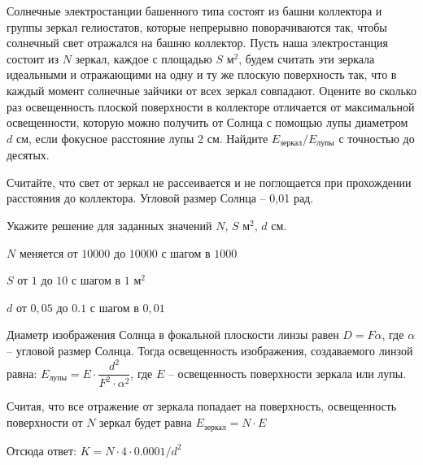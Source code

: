 Солнечные электростанции башенного типа состоят из башни
коллектора и группы зеркал гелиостатов, которые непрерывно поворачиваются так,
чтобы солнечный свет отражался на башню коллектор. Пусть наша электростанция
состоит из $N$ зеркал, каждое с площадью $S$ м$^2$, будем считать эти зеркала идеальными и отражающими
на одну и ту же плоскую поверхность так, что в каждый момент солнечные зайчики
от всех зеркал совпадают. Оцените во сколько раз освещенность плоской
поверхности в коллекторе отличается от максимальной освещенности, которую можно
получить от Солнца с помощью лупы диаметром $d$ см, если фокусное расстояние лупы 2 см. Найдите $E_{\text{зеркал}}/E_{\text{лупы}}$ с точностью
до десятых.

Считайте, что
свет от зеркал не рассеивается и не поглощается при прохождении расстояния до
коллектора. Угловой размер Солнца – 0,01 рад.

Укажите решение для заданных значений $N$, $S$ м$^2$, $d$ см.

\paramSection

$N$ меняется от $10000$ до $10000$ с шагом в $1000$

$S$ от $1$ до $10$ с шагом в $1$ м$^2$

$d$ от $0,05$ до $0.1$ с шагом в $0,01$

\soultionSection

Диаметр изображения Солнца в фокальной плоскости линзы равен 
$D = F \alpha$, где  $\alpha$ – угловой размер Солнца. Тогда освещенность изображения, 
создаваемого линзой равна: $E_{\text{лупы}} = E \cdot \dfrac{d^2}{F^2 \cdot \alpha^2}$, где $E$ – освещенность 
поверхности зеркала или лупы.

Считая, что все отражение от зеркала попадает на поверхность, освещенность поверхности от $N$ зеркал будет 
равна $E_{\text{зеркал}} = N \cdot E$

Отсюда ответ:
		$K = N \cdot 4 \cdot 0.0001/d^2$


